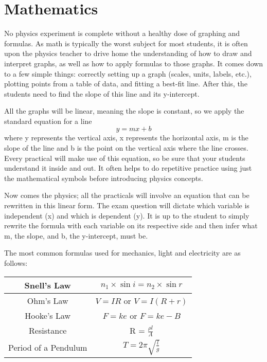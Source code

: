 \documentclass[12pt,a4paper]{report}
\begin{document}
\section{Mathematics}

No physics experiment is complete without a healthy dose of graphing and
formulas. As math is typically the worst subject for most students, it is often upon the
physics teacher to drive home the understanding of how to draw and interpret graphs, as
well as how to apply formulas to those graphs. It comes down to a few simple things:
correctly setting up a graph (scales, units, labels, etc.), plotting points from a table of
data, and fitting a best-fit line. After this, the students need to find the slope of this line
and its y-intercept.

All the graphs will be linear, meaning the slope is constant, so we apply the standard
equation for a line
$$y=mx + b$$
where y represents the vertical axis, x represents the horizontal axis, m is the slope of the line and b is the point on the vertical axis where the line crosses. Every practical will make use of this equation, so be sure that your students understand it inside and out. It often helps to do repetitive practice using just the mathematical symbols before introducing physics concepts.

Now comes the physics; all the practicals will involve an equation that can be
rewritten in this linear form. The exam question will dictate which variable is
independent (x) and which is dependent (y). It is up to the student to simply rewrite the
formula with each variable on its respective side and then infer what m, the slope, and b,
the y-intercept, must be.

The most common formulas used for mechanics, light and electricity are as follows:

\begin{center}
\begin{tabular}{ | c | c | }
\hline
Snell's Law & $n_1 \times \sin{i} = n_2 \times \sin{r}$ \\ \hline
Ohm's Law & $V=IR$ or $V = I(R + r)$\\ \hline
Hooke's Law & $ F = ke $ or $ F = ke - B $ \\ \hline
Resistance & R = $\frac{\rho l}{A}$ \\ \hline
Period of a Pendulum & $T = 2\pi\sqrt{\frac{l}{g}}$ \\ \hline
\end{tabular}
\end{center}
\end{document}
